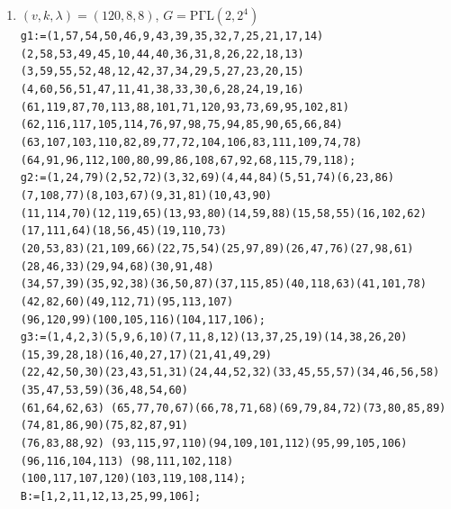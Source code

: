 \documentclass[a4paper,twopage,reqno,12pt]{amsart}
\theoremstyle{definition}
\numberwithin{equation}{section}
\newcommand{\PGaL}{\mathrm{P\Gamma L}}
\newcommand{\Aut}{\mathrm{Aut}}
\begin{document}
\begin{enumerate}
    \item\label{12088} $(v,k,\lambda)=(120,8,8)$, $G=\PGaL(2,2^4)$\\
    {\tiny \texttt{g1:=(1,57,54,50,46,9,43,39,35,32,7,25,21,17,14)(2,58,53,49,45,10,44,40,36,31,8,26,22,18,13)\\
    (3,59,55,52,48,12,42,37,34,29,5,27,23,20,15)(4,60,56,51,47,11,41,38,33,30,6,28,24,19,16)\\
    (61,119,87,70,113,88,101,71,120,93,73,69,95,102,81)(62,116,117,105,114,76,97,98,75,94,85,90,65,66,84)\\
    (63,107,103,110,82,89,77,72,104,106,83,111,109,74,78)(64,91,96,112,100,80,99,86,108,67,92,68,115,79,118);}\\
    \texttt{g2:=(1,24,79)(2,52,72)(3,32,69)(4,44,84)(5,51,74)(6,23,86)(7,108,77)(8,103,67)(9,31,81)(10,43,90)\\(11,114,70)(12,119,65)(13,93,80)(14,59,88)(15,58,55)(16,102,62)(17,111,64)(18,56,45)(19,110,73)\\(20,53,83)(21,109,66)(22,75,54)(25,97,89)(26,47,76)(27,98,61)(28,46,33)(29,94,68)(30,91,48)\\(34,57,39)(35,92,38)(36,50,87)(37,115,85)(40,118,63)(41,101,78)(42,82,60)(49,112,71)(95,113,107)\\(96,120,99)(100,105,116)(104,117,106);}\\
    \texttt{g3:=(1,4,2,3)(5,9,6,10)(7,11,8,12)(13,37,25,19)(14,38,26,20)(15,39,28,18)(16,40,27,17)(21,41,49,29)\\
(22,42,50,30)(23,43,51,31)(24,44,52,32)(33,45,55,57)(34,46,56,58)(35,47,53,59)(36,48,54,60)\\(61,64,62,63)
(65,77,70,67)(66,78,71,68)(69,79,84,72)(73,80,85,89)(74,81,86,90)(75,82,87,91)\\(76,83,88,92)
(93,115,97,110)(94,109,101,112)(95,99,105,106)(96,116,104,113)
(98,111,102,118)\\(100,117,107,120)(103,119,108,114);}\\}
    \texttt{B:=[1,2,11,12,13,25,99,106];}\\


\end{enumerate}
\end{document}
